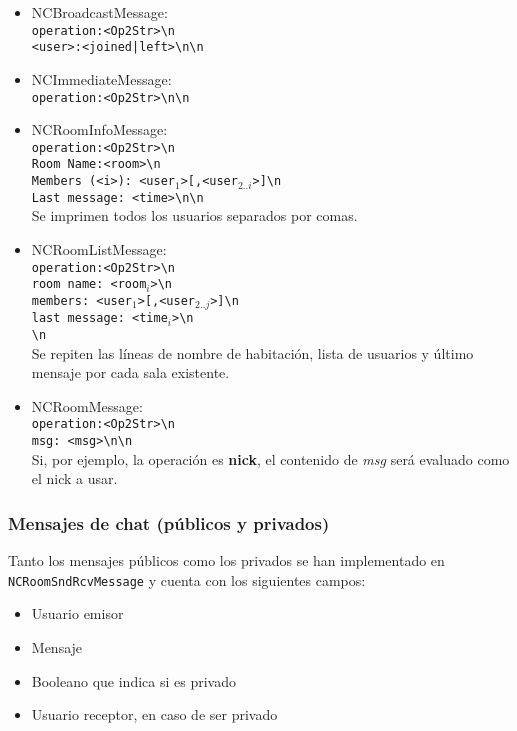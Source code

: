 \documentclass{article}
\begin{document}
\begin{itemize}
\item NCBroadcastMessage: \\ \texttt{operation:<Op2Str>{\textbackslash}n \\ <user>:<joined|left>{\textbackslash}n{\textbackslash}n}
\item NCImmediateMessage: \\ \texttt{operation:<Op2Str>{\textbackslash}n{\textbackslash}n}
\item NCRoomInfoMessage: \\ \texttt{operation:<Op2Str>{\textbackslash}n \\ Room Name:<room>{\textbackslash}n \\ Members (<i>): <user$_1$>[,<user$_{2..i}$>]{\textbackslash}n \\ Last message: <time>{\textbackslash}n{\textbackslash}n} \\ Se imprimen todos los usuarios separados por comas.
\item NCRoomListMessage: \\ \texttt{operation:<Op2Str>{\textbackslash}n \\ room name: <room$_i$>{\textbackslash}n \\ members: <user$_1$>[,<user$_{2..j}$>]{\textbackslash}n \\ last message: <time$_i$>{\textbackslash}n \\ {\textbackslash}n} \\ Se repiten las líneas de nombre de habitación, lista de usuarios y último mensaje por cada sala existente.
\item NCRoomMessage: \\ \texttt{operation:<Op2Str>{\textbackslash}n \\ msg: <msg>{\textbackslash}n{\textbackslash}n} \\ Si, por ejemplo, la operación es \textbf{nick}, el contenido de \textit{msg} será evaluado como el nick a usar.
\end{itemize}


\subsubsection{Mensajes de chat (públicos y privados)}

Tanto los mensajes públicos como los privados se han implementado en \texttt{NCRoomSndRcvMessage} y cuenta con los siguientes campos:

\begin{itemize}
	\item Usuario emisor
	\item Mensaje
	\item Booleano que indica si es privado
	\item Usuario receptor, en caso de ser privado
\end{itemize}
\end{document}
